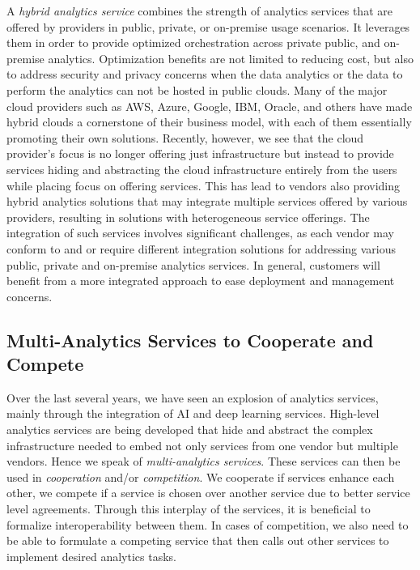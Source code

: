 A {\em hybrid analytics service} combines the strength of analytics
services that are offered by providers in public, private, or
on-premise usage scenarios. It leverages them in order to provide
optimized orchestration across private public, and on-premise
analytics. Optimization benefits are not limited to reducing cost, but
also to address security and privacy concerns when the data analytics
or the data to perform the analytics can not be hosted in public
clouds. Many of the major cloud providers such as AWS, Azure, Google,
IBM, Oracle, and others have made hybrid clouds a cornerstone of their
business model, with each of them essentially promoting their own
solutions. Recently, however, we see that the cloud provider's focus
is no longer offering just infrastructure but instead to provide
services hiding and abstracting the cloud infrastructure entirely from
the users while placing focus on offering services.  This has lead to
vendors also providing hybrid analytics solutions that may integrate
multiple services offered by various providers, resulting in solutions
with heterogeneous service offerings. The integration of such services
involves significant challenges, as each vendor may conform to and or
require different integration solutions for addressing various public,
private and on-premise analytics services. In general, customers will
benefit from a more integrated approach to ease deployment and
management concerns.

\subsection{Multi-Analytics Services to Cooperate and Compete}

Over the last several years, we have seen an explosion of analytics
services, mainly through the integration of AI and deep learning
services. High-level analytics services are being developed that hide
and abstract the complex infrastructure needed to embed not only
services from one vendor but multiple vendors. Hence we speak of {\em
multi-analytics services}. These services can then be used in {\em
cooperation} and/or {\em competition}. We cooperate if services
enhance each other, we compete if a service is chosen over another
service due to better service level agreements. Through this interplay
of the services, it is beneficial to formalize interoperability
between them. In cases of competition, we also need to be able to
formulate a competing service that then calls out other services to
implement desired analytics tasks.

